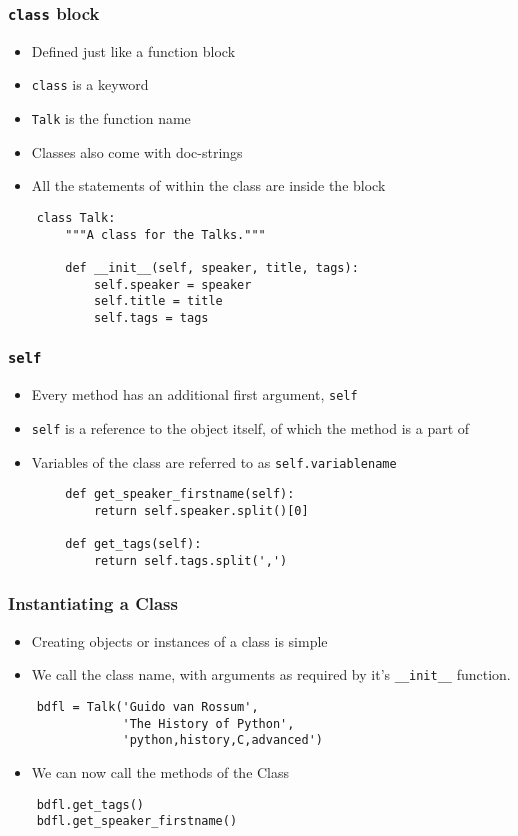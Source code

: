 \begin{frame}[fragile]
  \frametitle{\texttt{class} block}
  \begin{itemize}
  \item Defined just like a function block
  \item \texttt{class} is a keyword
  \item \texttt{Talk} is the function name
  \item Classes also come with doc-strings
  \item All the statements of within the class are inside the block
  \end{itemize}
  \begin{lstlisting}
    class Talk:
        """A class for the Talks."""

        def __init__(self, speaker, title, tags):
            self.speaker = speaker
            self.title = title
            self.tags = tags
  \end{lstlisting}
\end{frame}

\begin{frame}[fragile]
  \frametitle{\texttt{self}}
  \begin{itemize}
  \item Every method has an additional first argument, \texttt{self}
  \item \texttt{self} is a reference to the object itself, of which
    the method is a part of
  \item Variables of the class are referred to as \texttt{self.variablename}
  \end{itemize}
  \begin{lstlisting}
        def get_speaker_firstname(self):
            return self.speaker.split()[0]

        def get_tags(self):
            return self.tags.split(',')
  \end{lstlisting}
\end{frame}

\begin{frame}[fragile]
  \frametitle{Instantiating a Class}
  \begin{itemize}
  \item Creating objects or instances of a class is simple
  \item We call the class name, with arguments as required by it's
    \texttt{\_\_init\_\_} function. 
  \end{itemize}
  \begin{lstlisting}
    bdfl = Talk('Guido van Rossum', 
                'The History of Python', 
                'python,history,C,advanced')
  \end{lstlisting}
  \begin{itemize}
  \item We can now call the methods of the Class
  \end{itemize}
  \begin{lstlisting}
    bdfl.get_tags()
    bdfl.get_speaker_firstname()
  \end{lstlisting}
\end{frame}

